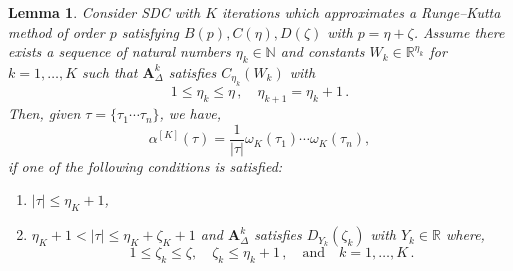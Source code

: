 \documentclass[sn-mathphys-num]{sn-jnl}%
\newcommand{\reva}[1]{#1}%
\theoremstyle{thmstyleone}%
\newtheorem{lemma}{Lemma}%
\theoremstyle{thmstyletwo}%
\theoremstyle{thmstylethree}%
\begin{document}
\begin{lemma}\label{lemma:ai_gen_form}
    Consider SDC with $K$ iterations which approximates a \reva{Runge--Kutta method of order $p$ satisfying $B(p), C(\eta), D(\zeta)$ with $p = \eta + \zeta$. Assume there exists a sequence of natural numbers $\eta_k \in \mathbb{N}$ and constants $W_k \in \mathbb{R}^{\eta_k}$ for $k=1,\dots, K$ such that $\bm{A}^k_\Delta$ satisfies $C_{\eta_k}(W_k)$ with
    \[ 1 \leq \eta_k \leq \eta \,, \quad \eta_{k+1} = \eta_k + 1 \,. \]
    Then, given $\tau = \{\tau_1 \cdots \tau_n\}$, we have,
    \begin{equation}\label{eq:ai_gen_form}
        \alpha^{[K]} (\tau) = \frac{1}{|\tau|} \omega_K (\tau_1) \cdots \omega_K (\tau_n),
    \end{equation}
    if one of the following conditions is satisfied:
    \begin{enumerate}
        \item $|\tau| \leq \eta_K + 1$,
        \item $\eta_K + 1 < |\tau| \leq \eta_K + \zeta_K + 1$ and $\bm{A}_\Delta^k$ satisfies $D_{Y_k}(\zeta_k)$ with $Y_k \in \mathbb{R}$ where,
            \[ 1 \leq \zeta_k \leq \zeta, \quad \zeta_k \leq \eta_k + 1 \,, \quad \text{and} \quad k = 1, \dots, K \,. \]
    \end{enumerate}}
\end{lemma}
\end{document}
